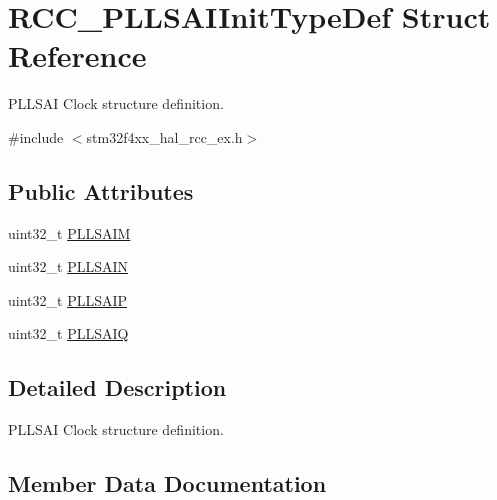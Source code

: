 \hypertarget{struct_r_c_c___p_l_l_s_a_i_init_type_def}{}\section{R\+C\+C\+\_\+\+P\+L\+L\+S\+A\+I\+Init\+Type\+Def Struct Reference}
\label{struct_r_c_c___p_l_l_s_a_i_init_type_def}


P\+L\+L\+S\+AI Clock structure definition.  




{\ttfamily \#include $<$stm32f4xx\+\_\+hal\+\_\+rcc\+\_\+ex.\+h$>$}

\subsection*{Public Attributes}
\begin{DoxyCompactItemize}
\item 
uint32\+\_\+t \hyperlink{struct_r_c_c___p_l_l_s_a_i_init_type_def_a8cf099e8f1fcd2aae663b7dec31af622}{P\+L\+L\+S\+A\+IM}
\item 
uint32\+\_\+t \hyperlink{struct_r_c_c___p_l_l_s_a_i_init_type_def_a7ec92e831b8ca06243fce02f46b76807}{P\+L\+L\+S\+A\+IN}
\item 
uint32\+\_\+t \hyperlink{struct_r_c_c___p_l_l_s_a_i_init_type_def_a8cfa7d387fc9b118e9066a63d2b845bf}{P\+L\+L\+S\+A\+IP}
\item 
uint32\+\_\+t \hyperlink{struct_r_c_c___p_l_l_s_a_i_init_type_def_addd252bc81b5eb646803cf3e0941499c}{P\+L\+L\+S\+A\+IQ}
\end{DoxyCompactItemize}


\subsection{Detailed Description}
P\+L\+L\+S\+AI Clock structure definition. 

\subsection{Member Data Documentation}
